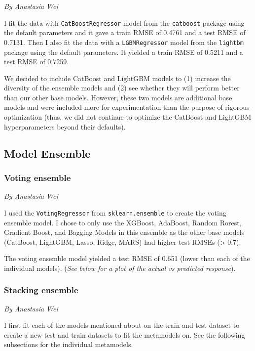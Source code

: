 \documentclass[
  letterpaper,
  DIV=11,
  numbers=noendperiod]{scrartcl}
\begin{document}
\emph{By Anastasia Wei}

I fit the data with \texttt{CatBoostRegressor} model from the
\texttt{catboost} package using the default parameters and it gave a
train RMSE of 0.4761 and a test RMSE of 0.7131. Then I also fit the data
with a \texttt{LGBMRegressor} model from the \texttt{lightbm} package
using the default parameters. It yielded a train RMSE of 0.5211 and a
test RMSE of 0.7259.

We decided to include CatBoost and LightGBM models to (1) increase the
diversity of the ensemble models and (2) see whether they will perform
better than our other base models. However, these two models are
additional base models and were included more for experimentation than
the purpose of rigorous optimization (thus, we did not continue to
optimize the CatBoost and LightGBM hyperparameters beyond their
defaults).

\hypertarget{model-ensemble}{%
\subsection{Model Ensemble}\label{model-ensemble}}

\hypertarget{voting-ensemble}{%
\subsubsection{Voting ensemble}\label{voting-ensemble}}

\emph{By Anastasia Wei}

I used the \texttt{VotingRegressor} from \texttt{sklearn.ensemble} to
create the voting ensemble model. I chose to only use the XGBoost,
AdaBoost, Random Rorest, Gradient Boost, and Bagging Models in this
ensemble as the other base models (CatBoost, LightGBM, Lasso, Ridge,
MARS) had higher test RMSEs (\textgreater{} 0.7).

The voting ensemble model yielded a test RMSE of 0.651 (lower than each
of the individual models). (\emph{See below for a plot of the actual vs
predicted response}).

\hypertarget{stacking-ensemble}{%
\subsubsection{Stacking ensemble}\label{stacking-ensemble}}

\emph{By Anastasia Wei}

I first fit each of the models mentioned about on the train and test
dataset to create a new test and train datasets to fit the metamodels
on. See the following subsections for the individual metamodels.
\end{document}
